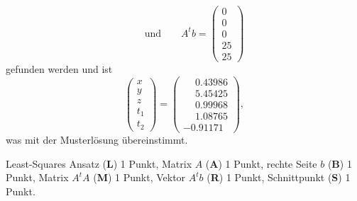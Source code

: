 \begin{diskussion}
\[\qquad\text{und}\qquad
A^tb=\begin{pmatrix}
    0 \\
    0 \\
    0 \\
   25 \\
   25
\end{pmatrix}
\]
gefunden werden und ist
\[
\begin{pmatrix}
x\\y\\z\\t_1\\t_2
\end{pmatrix}
=
\begin{pmatrix}
\phantom{-}0.43986\\
\phantom{-}5.45425\\
\phantom{-}0.99968\\
\phantom{-}1.08765\\
         - 0.91171
\end{pmatrix},
\]
was mit der Musterlösung übereinstimmt.
\end{diskussion}

\begin{bewertung}
Least-Squares Ansatz ({\bf L}) 1 Punkt,
Matrix $A$ ({\bf A}) 1 Punkt,
rechte Seite $b$ ({\bf B}) 1 Punkt,
Matrix $A^tA$ ({\bf M}) 1 Punkt,
Vektor $A^tb$ ({\bf R}) 1 Punkt,
Schnittpunkt ({\bf S}) 1 Punkt.
\end{bewertung}


